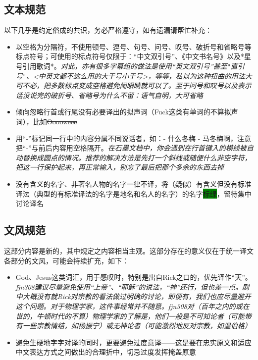 \documentclass{ctexart}
\begin{document}
\subsection{文本规范}

以下几乎是约定俗成的共识，务必严格遵守，如有遗漏请帮忙补充：

\begin{itemize}
    \item 以空格为分隔符，不使用顿号、逗号、句号、问号、叹号、破折号和省略号等标点符号；可使用的标点符号仅限于：“中文双引号”、《中文书名号》以及*星号引用歌词*。\emph{\small 对此，亦有很多字幕组的做法是使用``英文双引号''甚至\texttt{"}直引号\texttt{"}、<中英文都不这么用的大于号小于号>，等等，私以为这种扭曲的用法大可不必，把多数标点变成空格避免闹眼睛就可以了。至于问号和叹号以及表示话没说完的破折号、省略号为什么不留：语气自明，大可省略}
    \item 倾向忽略行首或行尾没有必要译出的拟声词（Fuck这类有单词的不算拟声词），比如\sout{Ooooweee}
    \item 用“-”标记同一行中的内容分属不同说话者，如：- 什么冬梅 - 马冬梅啊，注意把“-”与前后内容用空格隔开。\emph{\small 在石墨文档中，你会遇到在行首键入的横线被自动替换成圆点的情况。推荐的解决方法是先打一个斜线或随便什么非空字符，把这一行保护起来，再正常输入，别忘了最后把那个多余的东西去掉}
    \item 没有含义的名字、非著名人物的名字一律不译，将（疑似）有含义但没有标准译法（典型的有标准译法的名字是地名和名人的名字）的名字\colorbox{green}{标绿}，留待集中讨论译名
\end{itemize}

\subsection{文风规范}\label{trans}

这部分内容是新的，其中规定之内容相当主观。这部分存在的意义仅在于统一译文各部分的文风，可能会持续扩充，如下：

\begin{itemize}
    \item God、Jesus这类词汇，用于感叹时，特别是出自Rick之口的，优先译作“天”。\emph{\small fjn308建议尽量避免使用“上帝”、“耶稣”的说法，“神”还行，但也差一点。剧中大概没有就Rick对宗教的看法做过明确的讨论，即便有，我们也应尽量避开这个问题。对于物理学家，这件事经常并不随意。fjn308对（百年之内的或在世的，牛顿时代的不算）物理学家的了解是，他们一般是不可知论者（可能带有一些宗教情结，如杨振宁）或无神论者（可能激烈地反对宗教，如温伯格）}
    \item 避免生硬地字字对译的同时，更要避免过度意译——这是要在忠实原文和适应中文表达方式之间做出的合理折中，切忌过度发挥掩盖原意
\end{itemize}
\end{document}
